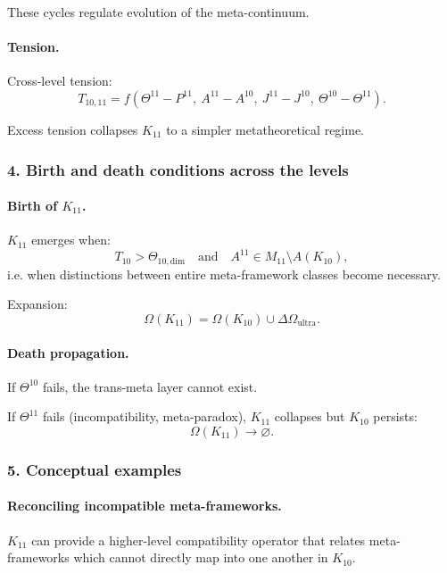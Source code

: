 These cycles regulate evolution of the meta-continuum.

\paragraph{Tension.}
Cross-level tension:
\[
T_{10,11} =
f(\Theta^{11} - P^{11},\ A^{11} - A^{10},\
  J^{11} - J^{10},\ \Theta^{10} - \Theta^{11}).
\]

Excess tension collapses $K_{11}$ to a simpler metatheoretical regime.

\subsubsection{4. Birth and death conditions across the levels}

\paragraph{Birth of $K_{11}$.}
$K_{11}$ emerges when:
\[
T_{10} > \Theta_{10,\mathrm{dim}}
\quad\text{and}\quad
A^{11} \in M_{11} \setminus A(K_{10}),
\]
i.e. when distinctions between entire meta-framework classes become necessary.

Expansion:
\[
\Omega(K_{11}) = \Omega(K_{10}) \cup \Delta\Omega_{\mathrm{ultra}}.
\]

\paragraph{Death propagation.}
If $\Theta^{10}$ fails, the trans-meta layer cannot exist.

If $\Theta^{11}$ fails (incompatibility, meta-paradox), $K_{11}$ collapses but
$K_{10}$ persists:
\[
\Omega(K_{11}) \rightarrow \varnothing.
\]

\subsubsection{5. Conceptual examples}

\paragraph{Reconciling incompatible meta-frameworks.}
$K_{11}$ can provide a higher-level compatibility operator that relates
meta-frameworks which cannot directly map into one another in $K_{10}$.

